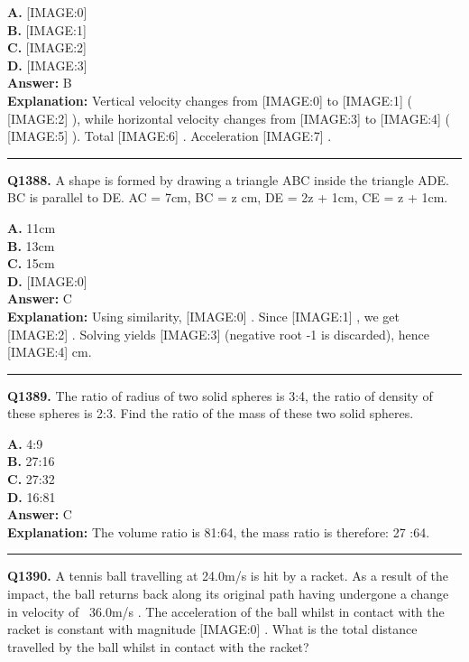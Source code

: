 \documentclass[12pt]{article}
\begin{document}
\textbf{A.} [IMAGE:0] \\
\textbf{B.} [IMAGE:1] \\
\textbf{C.} [IMAGE:2] \\
\textbf{D.} [IMAGE:3] \\

\textbf{Answer:} B \\
\textbf{Explanation:} Vertical velocity changes from
[IMAGE:0]
to
[IMAGE:1]
(
[IMAGE:2]
), while horizontal velocity changes from
[IMAGE:3]
to
[IMAGE:4]
(
[IMAGE:5]
). Total
[IMAGE:6]
. Acceleration
[IMAGE:7]
.

\hrule
\vspace{1em}


\noindent
\textbf{Q1388.} A shape is formed by drawing a triangle ABC inside the triangle ADE.
BC is parallel to DE. AC = 7cm, BC = z cm, DE = 2z + 1cm, CE = z + 1cm.



\textbf{A.} 11cm \\
\textbf{B.} 13cm \\
\textbf{C.} 15cm \\
\textbf{D.} [IMAGE:0] \\

\textbf{Answer:} C \\
\textbf{Explanation:} Using similarity,
[IMAGE:0]
. Since
[IMAGE:1]
, we get
[IMAGE:2]
. Solving yields
[IMAGE:3]
(negative root -1 is discarded), hence
[IMAGE:4]
cm.

\hrule
\vspace{1em}


\noindent
\textbf{Q1389.} The ratio of radius of two solid spheres is 3:4, the ratio of density of these spheres is 2:3. Find the ratio of the mass of these two solid spheres.



\textbf{A.} 4:9 \\
\textbf{B.} 27:16 \\
\textbf{C.} 27:32 \\
\textbf{D.} 16:81 \\

\textbf{Answer:} C \\
\textbf{Explanation:} The volume ratio is 81:64, the mass ratio is therefore: 27 :64.

\hrule
\vspace{1em}


\noindent
\textbf{Q1390.} A tennis ball travelling at 24.0m/s
is hit by a racket. As a result of the impact, the ball returns back along its original path having undergone a change in velocity of  36.0m/s
. The acceleration of the ball whilst in contact with the racket is constant with magnitude
[IMAGE:0]
.
What is the total distance travelled by the ball whilst in contact with the racket?
\end{document}
